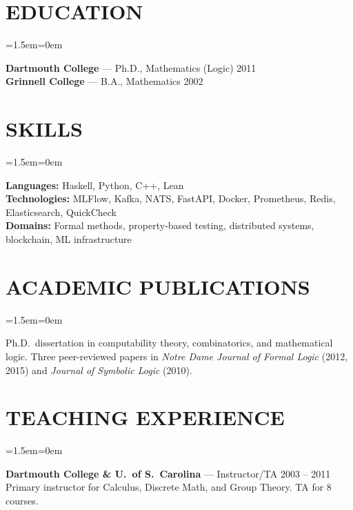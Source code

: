 \documentclass[11pt,letterpaper]{article}
\newenvironment{indentblock}{\begin{list}{}{\leftmargin=1.5em\rightmargin=0em}\item[]}{\end{list}}
\begin{document}
\section{EDUCATION}

\begin{indentblock}
{\color{headercolor}\textbf{Dartmouth College}} --- Ph.D., Mathematics (Logic) \hfill 2011 \\[2pt]
{\color{headercolor}\textbf{Grinnell College}} --- B.A., Mathematics \hfill 2002
\end{indentblock}

\section{SKILLS}

\begin{indentblock}
\textbf{Languages:} Haskell, Python, C++, Lean \\
\textbf{Technologies:} MLFlow, Kafka, NATS, FastAPI, Docker, Prometheus, Redis, Elasticsearch, QuickCheck \\
\textbf{Domains:} Formal methods, property-based testing, distributed systems, blockchain, ML infrastructure
\end{indentblock}

\section{ACADEMIC PUBLICATIONS}

\begin{indentblock}
Ph.D.\ dissertation in computability theory, combinatorics, and mathematical logic.
Three peer-reviewed papers in \textit{Notre Dame Journal of Formal Logic} (2012, 2015)
and \textit{Journal of Symbolic Logic} (2010).
\end{indentblock}

\section{TEACHING EXPERIENCE}

\begin{indentblock}
{\color{headercolor}\textbf{Dartmouth College \& U.\ of S.\ Carolina}} --- Instructor/TA \hfill 2003 -- 2011 \\
Primary instructor for Calculus, Discrete Math, and Group Theory. TA for 8 courses.
\end{indentblock}
\end{document}
